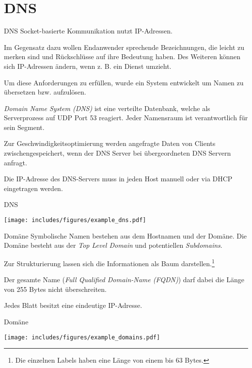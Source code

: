 \section{DNS}

\begin{defi}{DNS}
    Socket-basierte Kommunikation nutzt IP-Adressen.

    Im Gegensatz dazu wollen Endanwender sprechende Bezeichnungen, die leicht zu merken sind und Rückschlüsse auf ihre Bedeutung haben.
    Des Weiteren können sich IP-Adressen ändern, wenn z. B. ein Dienst umzieht.

    Um diese Anforderungen zu erfüllen, wurde ein System entwickelt um Namen zu übersetzen bzw. aufzulösen.

    \emph{Domain Name System (DNS)} ist eine verteilte Datenbank, welche als Serverprozess auf UDP Port 53 reagiert.
    Jeder Namensraum ist verantwortlich für sein Segment.

    Zur Geschwindigkeitsoptimierung werden angefragte Daten von Clients zwischengespeichert, wenn der DNS Server bei übergeordneten DNS Servern anfragt.

    Die IP-Adresse des DNS-Servers muss in jeden Host manuell oder via DHCP eingetragen werden.
\end{defi}

\begin{example}{DNS}
    \begin{center}
        \texttt{[image: includes/figures/example\_dns.pdf]}
    \end{center}
\end{example}

\begin{defi}{Domäne}
    Symbolische Namen bestehen aus dem Hostnamen und der Domäne.
    Die Domäne besteht aus der \emph{Top Level Domain} und potentiellen \emph{Subdomains}.

    Zur Strukturierung lassen sich die Informationen als Baum darstellen.\footnote{Die einzelnen Labels haben eine Länge von einem bis 63 Bytes.}

    Der gesamte Name (\emph{Full Qualified Domain-Name (FQDN)}) darf dabei die Länge von 255 Bytes nicht überschreiten.

    Jedes Blatt besitzt eine eindeutige IP-Adresse.
\end{defi}

\begin{example}{Domäne}
    \begin{center}
        \texttt{[image: includes/figures/example\_domains.pdf]}
    \end{center}
\end{example}

